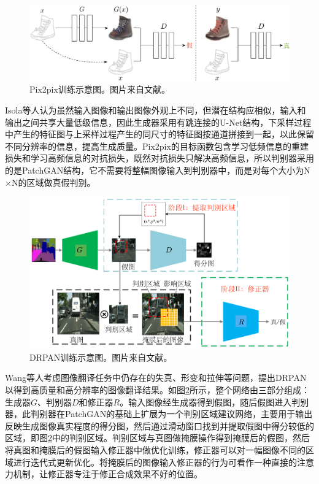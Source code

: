 \begin{figure}[ht]
    \centering
	\includegraphics[width=\textwidth]{figs/pix2pix.pdf}
	\caption{Pix2pix训练示意图。图片来自文献\cite{isola2017image}。}
	\label{pix2pix}
\end{figure}

Isola等人认为虽然输入图像和输出图像外观上不同，但潜在结构应相似，输入和输出之间共享大量低级信息，因此生成器采用有跳连接的U-Net\cite{ronneberger2015u}结构，下采样过程中产生的特征图与上采样过程产生的同尺寸的特征图按通道拼接到一起，以此保留不同分辨率的信息，提高生成质量。Pix2pix的目标函数包含学习低频信息的重建损失和学习高频信息的对抗损失，既然对抗损失只解决高频信息，所以判别器采用的是PatchGAN结构，它不需要将整幅图像输入到判别器中，而是对每个大小为N$\times$N的区域做真假判别。

\begin{figure}[ht]
    \centering
	\includegraphics[width=.9\textwidth]{figs/DRPAN.pdf}
	\caption{DRPAN训练示意图。图片来自文献\cite{wang2019discriminative}。}
	\label{DRPAN}
\end{figure}

Wang等人\cite{wang2019discriminative}考虑图像翻译任务中仍存在的失真、形变和拉伸等问题，提出DRPAN以得到高质量和高分辨率的图像翻译结果。如图\ref{DRPAN}所示，整个网络由三部分组成：生成器$G$、判别器$D$和修正器$R$。输入图像经生成器得到假图，随后假图进入判别器，此判别器在PatchGAN的基础上扩展为一个判别区域建议网络，主要用于输出反映生成图像真实程度的得分图，然后通过滑动窗口找到并提取假图中得分较低的区域，即图\ref{DRPAN}中的判别区域。判别区域与真图做掩膜操作得到掩膜后的假图，然后将真图和掩膜后的假图输入修正器中做优化训练，修正器可以对一幅图像不同的区域进行迭代式更新优化。将掩膜后的图像输入修正器的行为可看作一种直接的注意力机制，让修正器专注于修正合成效果不好的位置。

